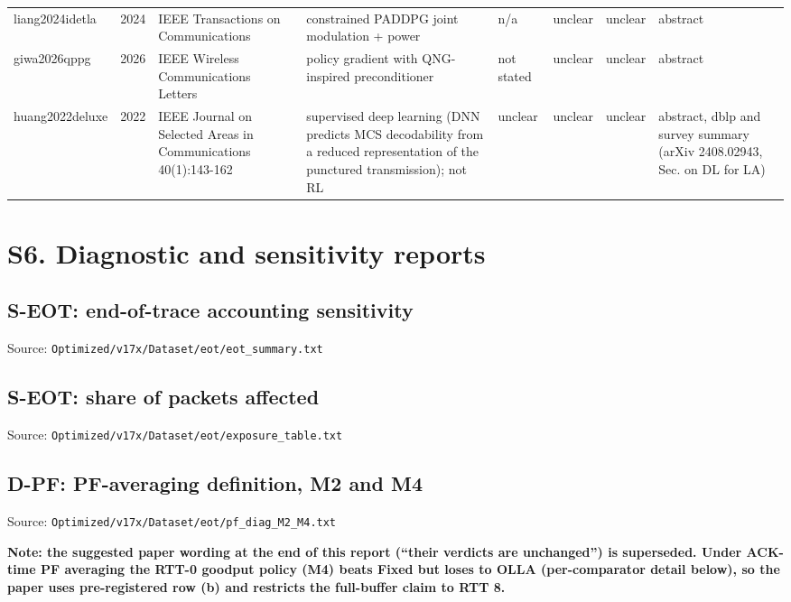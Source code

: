 \documentclass[10pt]{article}
\begin{document}
\begin{landscape}
\begin{longtable}{@{}llllllll@{}}
liang2024idetla & 2024 & IEEE Transactions on Communications & constrained PADDPG joint modulation + power & n/a & unclear & unclear & abstract \\
giwa2026qppg & 2026 & IEEE Wireless Communications Letters & policy gradient with QNG-inspired preconditioner & not stated & unclear & unclear & abstract \\
huang2022deluxe & 2022 & IEEE Journal on Selected Areas in Communications 40(1):143-162 & supervised deep learning (DNN predicts MCS decodability from a reduced representation of the punctured transmission); not RL & unclear & unclear & unclear & abstract, dblp and survey summary (arXiv 2408.02943, Sec. on DL for LA) \\
\bottomrule
\end{longtable}
\normalsize
\section{S6. Diagnostic and sensitivity reports}
\subsection*{S-EOT: end-of-trace accounting sensitivity}
\noindent Source: \texttt{Optimized/v17x/Dataset/eot/eot\_summary.txt}\par
{}
\subsection*{S-EOT: share of packets affected}
\noindent Source: \texttt{Optimized/v17x/Dataset/eot/exposure\_table.txt}\par
{}
\subsection*{D-PF: PF-averaging definition, M2 and M4}
\noindent Source: \texttt{Optimized/v17x/Dataset/eot/pf\_diag\_M2\_M4.txt}\par
\noindent\textbf{Note: the suggested paper wording at the end of this report (``their verdicts are unchanged'') is superseded. Under ACK-time PF averaging the RTT-0 goodput policy (M4) beats Fixed but loses to OLLA (per-comparator detail below), so the paper uses pre-registered row (b) and restricts the full-buffer claim to RTT 8.}\par\smallskip
{}

\end{landscape}
\end{document}
